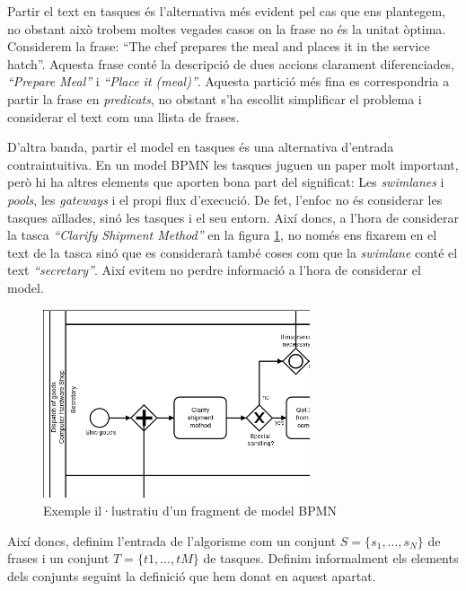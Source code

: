 Partir el text en tasques és l'alternativa més evident pel cas que ens plantegem, no obstant això trobem moltes vegades casos on la frase no és la unitat òptima. Considerem la frase: ``The chef prepares the meal and places it in the service hatch''. Aquesta frase conté la descripció de dues accions clarament diferenciades, \emph{``Prepare Meal''} i \emph{``Place it (meal)''}. Aquesta partició més fina es correspondria a partir la frase en \emph{predicats}, no obstant s'ha escollit simplificar el problema i considerar el text com una llista de frases.

D'altra banda, partir el model en tasques és una alternativa d'entrada contraintuitiva. En un model BPMN les tasques juguen un paper molt important, però hi ha altres elements que aporten bona part del significat: Les \emph{swimlanes} i \emph{pools}, les \emph{gateways} i el propi flux d'execució. De fet, l'enfoc no és considerar les tasques aïllades, sinó les tasques i el seu entorn. Així doncs, a l'hora de considerar la tasca \emph{``Clarify Shipment Method''} en la figura \ref{fig:exemple_secretary}, no només ens fixarem en el text de la tasca sinó que es considerarà també coses com que la \emph{swimlane} conté el text \emph{``secretary''}. Així evitem no perdre informació a l'hora de considerar el model.

\begin{figure}[!htb]
    \centering
    \includegraphics[width=0.7\textwidth]{figures/exemple-secretary.png} 
    \caption{Exemple il·lustratiu d'un fragment de model BPMN}
    \label{fig:exemple_secretary}
\end{figure}

Així doncs, definim l'entrada de l'algorisme com un conjunt $S = \{s_1, ..., s_N\}$ de frases i un conjunt $T = \{t1, ..., tM\}$ de tasques. Definim informalment els elements dels conjunts seguint la definició que hem donat en aquest apartat.

